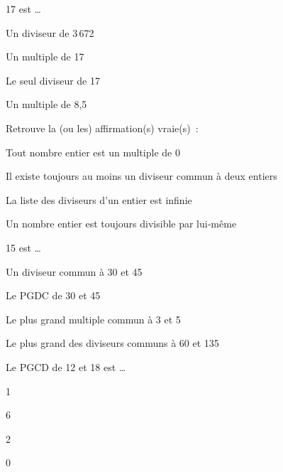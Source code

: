 \begin{QCM}
\begin{GroupeQCM}
    \begin{exercice}
      17 est \ldots
      \begin{ChoixQCM}{4}
      \item Un diviseur de 3\,672
      \item Un multiple de 17
      \item Le seul diviseur de 17
      \item Un multiple de 8,5
      \end{ChoixQCM}
\begin{corrige}
   \end{corrige}
    \end{exercice}

    \begin{exercice}
      Retrouve la (ou les) affirmation(s) vraie(s) :
      \begin{ChoixQCM}{4}
      \item Tout nombre entier est un multiple de 0
      \item Il existe toujours au moins un diviseur commun à deux entiers
      \item La liste des diviseurs d'un entier est infinie
      \item Un nombre entier est toujours divisible par lui‑même
      \end{ChoixQCM}
\begin{corrige}
   \end{corrige}
    \end{exercice}
    
    \begin{exercice}
      15 est \ldots
      \begin{ChoixQCM}{4}
      \item Un diviseur commun à 30 et 45
      \item Le PGDC de 30 et 45
      \item Le plus grand multiple commun à 3 et 5
      \item Le plus grand des diviseurs communs à 60 et 135
      \end{ChoixQCM}
\begin{corrige}
   \end{corrige}
    \end{exercice}
    
    \begin{exercice}
      Le PGCD de 12 et 18 est \ldots
      \begin{ChoixQCM}{4}
      \item 1
      \item 6
      \item 2
      \item 0
      \end{ChoixQCM}
\begin{corrige}
   \end{corrige}
    \end{exercice}


\end{GroupeQCM}
\end{QCM}
